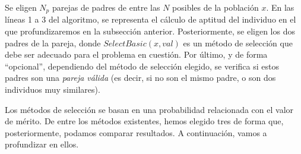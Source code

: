 \documentclass[12pt,a4paper]{book}
\begin{document}
Se eligen $N_p$ parejas de padres de entre las $N$ posibles de la población $x$. En las líneas 1 a 3  del algoritmo, se representa el cálculo de aptitud del individuo en el que profundizaremos en la subsección anterior. Posteriormente, se eligen los dos padres de la pareja, donde $SelectBasic(x, val)$ es un método de selección que debe ser adecuado para el problema en cuestión. Por último, y de forma ``opcional'', dependiendo del método de selección elegido, se verifica si estos padres son una \textsl{pareja válida} (es decir, si no son el mismo padre, o son dos individuos muy similares).


%
%
%
%	

Los métodos de selección se basan en una probabilidad relacionada con el valor de mérito. De entre los métodos existentes, hemos elegido tres de forma que, posteriormente, podamos comparar resultados. A continuación, vamos a profundizar en ellos. 
\end{document}
